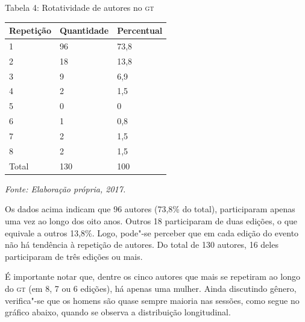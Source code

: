 \pagebreak
\begin{center}
Tabela 4: Rotatividade de autores no \textsc{gt}
\end{center}

\begin{center}
\centering
\begin{tabular}{|l|l|l|}
\hline
\textbf{Repetição} & \textbf{Quantidade} & \textbf{Percentual} \\ \hline
1 & 96 & 73,8 \\ \hline
2 & 18 & 13,8 \\ \hline
3 & 9 & 6,9 \\ \hline
4 & 2 & 1,5 \\ \hline
5 & 0 & 0 \\ \hline
6 & 1 & 0,8 \\ \hline
7 & 2 & 1,5 \\ \hline
8 & 2 & 1,5 \\ \hline
Total & 130 & 100 \\ \hline
\end{tabular}
\end{center}

\begin{center}
{\footnotesize\emph{Fonte: Elaboração própria, 2017.}}
\end{center}

Os dados acima indicam que 96 autores (73,8\% do total), participaram
apenas uma vez ao longo dos oito anos. Outros 18 participaram de duas
edições, o que equivale a outros 13,8\%. Logo, pode"-se perceber que em
cada edição do evento não há tendência à repetição de autores. Do
total de 130 autores, 16 deles participaram de três edições ou
mais.

É importante notar que, dentre os cinco autores que mais se
repetiram ao longo do \textsc{gt} (em 8, 7 ou 6 edições), há apenas uma mulher.
Ainda discutindo gênero, verifica"-se que os homens são quase sempre
maioria nas sessões, como segue no gráfico abaixo, quando se observa a
distribuição longitudinal.

\pagebreak



